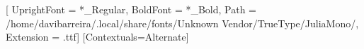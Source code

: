 \usepackage{fontspec}

\newfontfamily{}[
	UprightFont = *_Regular,
	BoldFont = *_Bold,
	Path = /home/davibarreira/.local/share/fonts/Unknown Vendor/TrueType/JuliaMono/,
	Extension = .ttf]
\newfontface{}
\newfontface{}
\setmonofont{JuliaMono-Medium}[Contextuals=Alternate]

